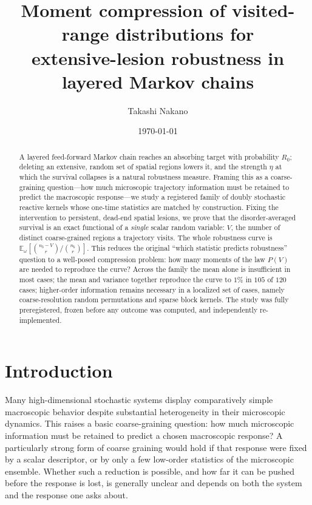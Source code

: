 \documentclass[aps,pre,twocolumn,superscriptaddress,floatfix,longbibliography]{revtex4-2}
\begin{document}
\title{Moment compression of visited-range distributions for\\
extensive-lesion robustness in layered Markov chains}

\author{Takashi Nakano}

\date{\today}

\begin{abstract}
A layered feed-forward Markov chain reaches an absorbing target with probability
$R_0$; deleting an extensive, random set of spatial regions lowers it, and the
strength $\eta$ at which the survival collapses is a natural robustness measure.
Framing this as a coarse-graining question---how much microscopic trajectory
information must be retained to predict the macroscopic response---we study a
registered family of doubly stochastic reactive kernels whose one-time statistics
are matched by construction. Fixing the intervention to
persistent, dead-end spatial lesions, we prove that the disorder-averaged survival
is an exact functional of a \emph{single} scalar random variable: $V$, the number
of distinct coarse-grained regions a trajectory visits. The whole robustness curve
is $\mathbb{E}_\omega\!\left[\binom{n_b-V}{r}/\binom{n_b}{r}\right]$. This reduces
the original ``which statistic predicts robustness'' question to a well-posed
compression problem: how many moments of the law $P(V)$ are needed to reproduce the
curve? Across the family the mean alone is insufficient in most cases; the mean and
variance together reproduce the curve to $1\%$ in $105$ of $120$ cases;
higher-order information remains necessary in a localized set of cases, namely
coarse-resolution random permutations and sparse block kernels. The study was fully
preregistered, frozen before any outcome was computed, and independently
re-implemented.
\end{abstract}

\maketitle

\section{Introduction}

Many high-dimensional stochastic systems display comparatively simple macroscopic
behavior despite substantial heterogeneity in their microscopic dynamics. This
raises a basic coarse-graining question: how much microscopic information must be
retained to predict a chosen macroscopic response? A particularly strong form of
coarse graining would hold if that response were fixed by a scalar descriptor, or by
only a few low-order statistics of the microscopic ensemble. Whether such a
reduction is possible, and how far it can be pushed before the response is lost, is
generally unclear and depends on both the system and the response one asks about.
\end{document}

